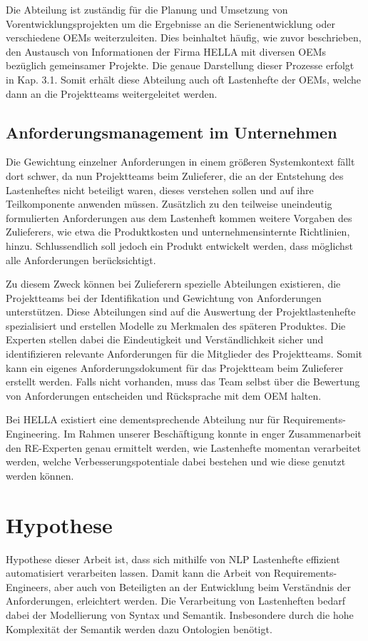 \documentclass[12pt]{report}
\begin{document}
Die Abteilung ist zuständig für die Planung und Umsetzung von Vorentwicklungsprojekten um die Ergebnisse an die Serienentwicklung oder verschiedene OEMs weiterzuleiten. Dies beinhaltet häufig, wie zuvor beschrieben, den Austausch von Informationen der Firma HELLA mit diversen OEMs bezüglich gemeinsamer Projekte. Die genaue Darstellung dieser Prozesse erfolgt in Kap. 3.1. Somit erhält diese Abteilung auch oft Lastenhefte der OEMs, welche dann an die Projektteams weitergeleitet werden. 

\subsection{Anforderungsmanagement im Unternehmen}
Die Gewichtung einzelner Anforderungen in einem größeren Systemkontext fällt dort schwer, da nun Projektteams beim Zulieferer, die an der Entstehung des Lastenheftes nicht beteiligt waren, dieses verstehen sollen und auf ihre Teilkomponente anwenden müssen. Zusätzlich zu den teilweise uneindeutig formulierten Anforderungen aus dem Lastenheft kommen weitere Vorgaben des Zulieferers, wie etwa die Produktkosten und unternehmensinternte Richtlinien, hinzu. Schlussendlich soll jedoch ein Produkt entwickelt werden, dass möglichst alle Anforderungen berücksichtigt. \cite{mw02}

Zu diesem Zweck können bei Zulieferern spezielle Abteilungen existieren, die Projektteams bei der Identifikation und Gewichtung von Anforderungen unterstützen. Diese Abteilungen sind auf die Auswertung der Projektlastenhefte spezialisiert und erstellen Modelle zu Merkmalen des späteren Produktes. Die Experten stellen dabei die Eindeutigkeit und Verständlichkeit sicher und identifizieren relevante Anforderungen für die Mitglieder des Projektteams. Somit kann ein eigenes Anforderungsdokument für das Projektteam beim Zulieferer erstellt werden. 
Falls nicht vorhanden, muss das Team selbst über die Bewertung von Anforderungen entscheiden und Rücksprache mit dem OEM halten.

Bei HELLA existiert eine dementsprechende Abteilung nur für Requirements-Engineering. Im Rahmen unserer Beschäftigung konnte in enger Zusammenarbeit den RE-Experten genau ermittelt werden, wie Lastenhefte momentan verarbeitet werden, welche Verbesserungspotentiale dabei bestehen und wie diese genutzt werden können.

\section{Hypothese}
Hypothese dieser Arbeit ist, dass sich mithilfe von NLP Lastenhefte effizient automatisiert verarbeiten lassen. Damit kann die Arbeit von Requirements-Engineers, aber auch von Beteiligten an der Entwicklung beim Verständnis der Anforderungen, erleichtert werden. Die Verarbeitung von Lastenheften bedarf dabei der Modellierung von Syntax und Semantik. Insbesondere durch die hohe Komplexität der Semantik werden dazu Ontologien benötigt. 
\end{document}
